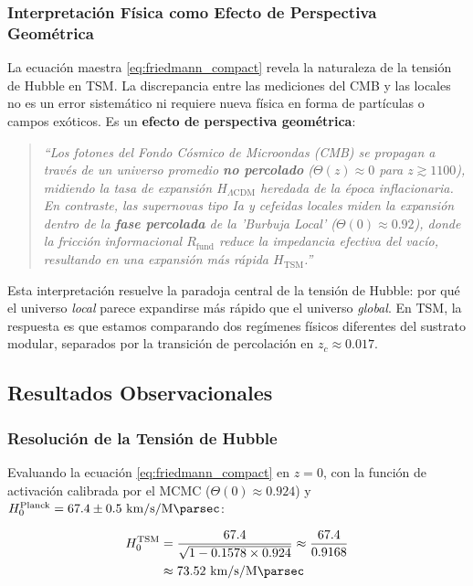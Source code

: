 \documentclass[11pt, a4paper]{article}
\theoremstyle{plain}
\theoremstyle{definition}
\newcommand{\Rfactor}{R_{\text{fund}}}
\begin{document}
\subsubsection{Interpretación Física como Efecto de Perspectiva Geométrica}
\label{subsec:efecto_perspectiva}

La ecuación maestra \eqref{eq:friedmann_compact} revela la naturaleza de la tensión de Hubble en TSM. La discrepancia entre las mediciones del CMB y las locales no es un error sistemático ni requiere nueva física en forma de partículas o campos exóticos. Es un \textbf{efecto de perspectiva geométrica}:

\begin{quote}
\emph{``Los fotones del Fondo Cósmico de Microondas (CMB) se propagan a través de un universo promedio \textbf{no percolado} ($\Theta(z) \approx 0$ para $z \gtrsim 1100$), midiendo la tasa de expansión $H_{\Lambda\text{CDM}}$ heredada de la época inflacionaria. En contraste, las supernovas tipo Ia y cefeidas locales miden la expansión dentro de la \textbf{fase percolada} de la 'Burbuja Local' ($\Theta(0) \approx 0.92$), donde la fricción informacional $\Rfactor$ reduce la impedancia efectiva del vacío, resultando en una expansión más rápida $H_{\text{TSM}}$.''}
\end{quote}

Esta interpretación resuelve la paradoja central de la tensión de Hubble: por qué el universo \textit{local} parece expandirse más rápido que el universo \textit{global}. En TSM, la respuesta es que estamos comparando dos regímenes físicos diferentes del sustrato modular, separados por la transición de percolación en $z_c \approx 0.017$.


\subsection{Resultados Observacionales}

\subsubsection{Resolución de la Tensión de Hubble}

Evaluando la ecuación \eqref{eq:friedmann_compact} en $z=0$, con la función de activación calibrada por el MCMC ($\Theta(0) \approx 0.924$) y $H_0^{\text{Planck}} = 67.4 \pm 0.5\ \si{\kilo\meter\per\second\per\mega\parsec}$:

\begin{align}
H_0^{\text{TSM}} &= \frac{67.4}{\sqrt{1 - 0.1578 \times 0.924}} \approx \frac{67.4}{0.9168} \\
&\approx 73.52\ \si{\kilo\meter\per\second\per\mega\parsec}
\end{align}
\end{document}
